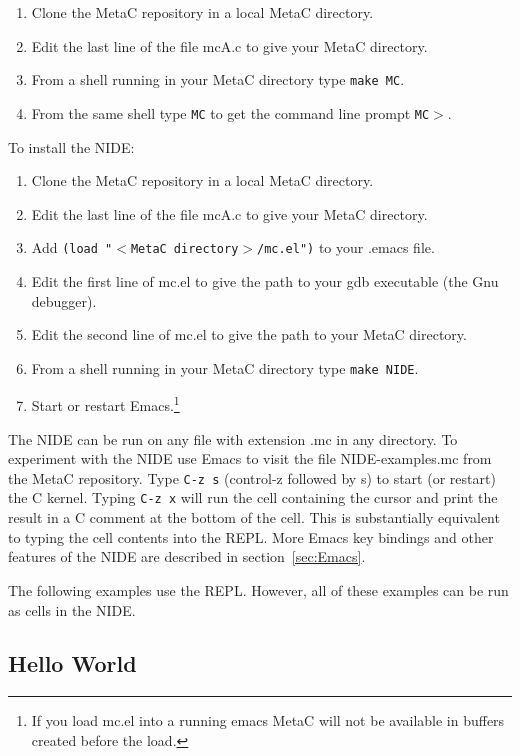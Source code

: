 \documentclass{article}
\begin{document}
\begin{enumerate}
\item Clone the MetaC repository in a local MetaC directory.
\item Edit the last line of the file mcA.c to give your MetaC directory.
\item From a shell running in your MetaC directory type {\tt make MC}.
\item From the same shell type {\tt MC} to get the command line prompt {\tt MC$>$}.
\end{enumerate}

\noindent To install the NIDE:

\begin{enumerate}
\item Clone the MetaC repository in a local MetaC directory.
\item Edit the last line of the file mcA.c to give your MetaC directory.
\item Add {\tt (load "$<$MetaC directory$>$/mc.el")} to your .emacs file.
\item Edit the first line of  mc.el to give the path to your gdb executable (the Gnu debugger).
\item Edit the second line of mc.el to give the path to your MetaC directory.
\item From a shell running in your MetaC directory type {\tt make NIDE}.
\item Start or restart Emacs.\footnote{If you load mc.el into a running emacs
MetaC will not be available in buffers created before the load.}
\end{enumerate}

\noindent The NIDE can be run on any file with extension .mc in any
directory. To experiment with the NIDE use Emacs to visit the file
NIDE-examples.mc from the MetaC repository.  Type {\tt C-z s}
(control-z followed by s) to start (or restart) the C kernel. Typing {\tt C-z x}
will run the cell containing the cursor and print the result in a C
comment at the bottom of the cell.  This is substantially equivalent
to typing the cell contents into the REPL.  More Emacs key bindings
and other features of the NIDE are described in
section~\ref{sec:Emacs}.

\medskip
\noindent The following examples use the REPL.  However, all of these examples can be run as cells in the NIDE.

\subsection{Hello World}
\label{sec:hello}
\end{document}

